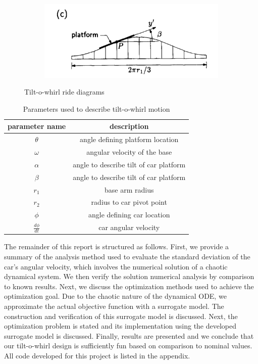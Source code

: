 \documentclass[11pt]{article}
\begin{document}
\begin{figure}[hbt!]
\begin{subfigure}{.25\textwidth}
\end{subfigure}%
\begin{subfigure}{.25\textwidth}
\centering
\includegraphics[width=.99\linewidth]{ride4}
\end{subfigure}
\caption{Tilt-o-whirl ride diagrams \cite{chaos}}
\label{fig:ride}
\end{figure}

\begin{table}[hbt!]
\centering
\begin{tabular}{c | c}
parameter name & description \\ \hline \hline
$\theta$ & angle defining platform location \\ \hline
$\omega$ & angular velocity of the base \\ \hline
$\alpha$ & angle to describe tilt of car platform \\ \hline
$\beta$ & angle to describe tilt of car platform \\ \hline
$r_1$ & base arm radius \\ \hline
$r_2$ & radius to car pivot point \\ \hline
$\phi$ & angle defining car location \\ \hline
$\frac{d \phi}{d t}$ & car angular velocity \\ \hline
\end{tabular}
\caption{Parameters used to describe tilt-o-whirl motion}
\label{table:variables}
\end{table}

The remainder of this report is structured as follows.
First, we provide a summary of the analysis method
used to evaluate the standard deviation of the car's
angular velocity, which involves the numerical solution
of a chaotic dynamical system. We then verify the
solution numerical analysis by comparison to known
results. Next, we discuss the optimization methods used
to achieve the optimization goal. Due to the chaotic
nature of the dynamical ODE, we approximate the actual
objective function with a surrogate model.
The construction and verification of this surrogate
model is discussed. Next, the optimization problem
is stated and its implementation using the developed
surrogate model is discussed. Finally, results are
presented and we conclude that our tilt-o-whirl design
is sufficiently fun based on comparison to nominal
values. All code developed for this project is listed
in the appendix.
\end{document}
